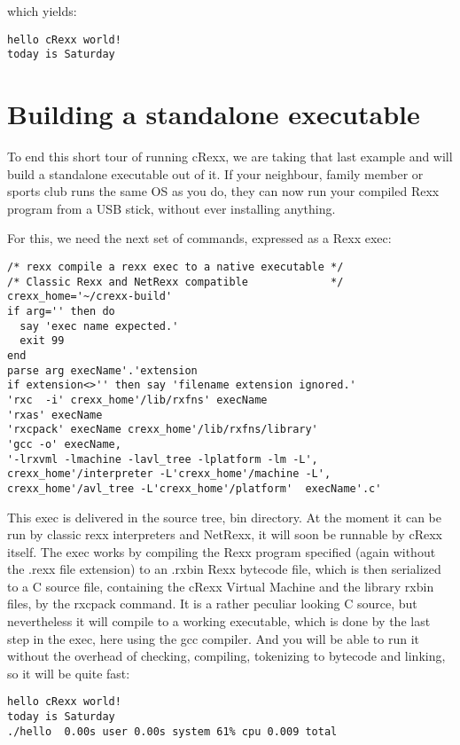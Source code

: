 which yields:

\begin{verbatim}
hello cRexx world!
today is Saturday
\end{verbatim}

\hypertarget{building-a-standalone-executable}{%
\section{Building a standalone
executable}\label{building-a-standalone-executable}}

To end this short tour of running cRexx, we are taking that last example
and will build a standalone executable out of it. If your neighbour,
family member or sports club runs the same OS as you do, they can now
run your compiled Rexx program from a USB stick, without ever installing
anything.

For this, we need the next set of commands, expressed as a Rexx exec:

\begin{verbatim}
/* rexx compile a rexx exec to a native executable */
/* Classic Rexx and NetRexx compatible             */
crexx_home='~/crexx-build'
if arg='' then do
  say 'exec name expected.'
  exit 99
end
parse arg execName'.'extension
if extension<>'' then say 'filename extension ignored.'
'rxc  -i' crexx_home'/lib/rxfns' execName
'rxas' execName
'rxcpack' execName crexx_home'/lib/rxfns/library'
'gcc -o' execName,
'-lrxvml -lmachine -lavl_tree -lplatform -lm -L',
crexx_home'/interpreter -L'crexx_home'/machine -L',
crexx_home'/avl_tree -L'crexx_home'/platform'  execName'.c'
\end{verbatim}

This exec is delivered in the source tree, bin directory. At the moment
it can be run by classic rexx interpreters and NetRexx, it will soon be
runnable by cRexx itself. The exec works by compiling the Rexx program
specified (again without the .rexx file extension) to an .rxbin Rexx
bytecode file, which is then serialized to a C source file, containing
the cRexx Virtual Machine and the library rxbin files, by the rxcpack
command. It is a rather peculiar looking C source, but nevertheless it
will compile to a working executable, which is done by the last step in
the exec, here using the gcc compiler. And you will be able to run it
without the overhead of checking, compiling, tokenizing to bytecode and
linking, so it will be quite fast:

\begin{verbatim}
hello cRexx world!
today is Saturday
./hello  0.00s user 0.00s system 61% cpu 0.009 total
\end{verbatim}
